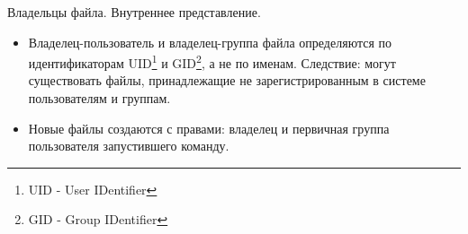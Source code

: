 \begin{frame}[fragile]{Владельцы файла. Внутреннее представление.}
  \begin{itemize}
    \item \alert{Владелец-пользователь} и \alert{владелец-группа} файла определяются по идентификаторам \alert{UID}\footnote{UID - User IDentifier} и \alert{GID}\footnote{GID - Group IDentifier}, а не по именам. 
 \pause
    Следствие: могут существовать файлы, принадлежащие не зарегистрированным в системе пользователям и группам. \pause
    \item Новые файлы создаются с правами: \alert{владелец и первичная группа} пользователя запустившего команду.
  \end{itemize}
\end{frame}
